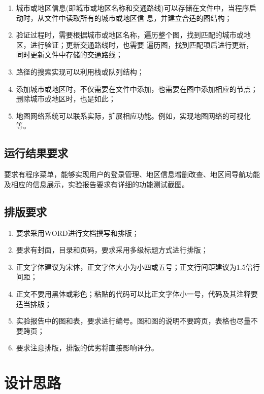 \documentclass[UTF8,12pt,a4paper]{ctexart}
\begin{document}
\begin{enumerate}[label=（\arabic*）, leftmargin=2em, itemsep=0.6em]
  \item 城市或地区信息(即城市或地区名称和交通路线)可以存储在文件中，当程序启动时，从文件中读取所有的城市或地区信       息，并建立合适的图结构；
  \item 验证过程时，需要根据城市或地区名称，遍历整个图，找到匹配的城市或地区，进行验证；更新交通路线时，也需要         遍历图，找到匹配项后进行更新，同时更新文件中存储的交通路线；
  \item 路径的搜索实现可以利用栈或队列结构；
  \item 添加城市或地区时，不仅需要在文件中添加，也需要在图中添加相应的节点；删除城市或地区时，也是如此；
  \item 地图网络系统可以联系实际，扩展相应功能。例如，实现地图网络的可视化等。
\end{enumerate}

\subsection{运行结果要求}

要求有程序菜单，能够实现用户的登录管理、地区信息增删改查、地区间导航功能及相应的信息展示，实验报告要求有详细的功能测试截图。

\subsection{排版要求}

\begin{enumerate}[label=（\arabic*）, leftmargin=2em, itemsep=0.6em]
  \item 要求采用WORD进行文档撰写和排版；
  \item 要求有封面，目录和页码，要求采用多级标题方式进行排版；
  \item 正文字体建议为宋体，正文字体大小为小四或五号；正文行间距建议为1.5倍行间距；
  \item 正文不要用黑体或彩色；粘贴的代码可以比正文字体小一号，代码及其注释要适当排版；
  \item 实验报告中的图和表，要求进行编号。图和图的说明不要跨页，表格也尽量不要跨页；
  \item 要求注意排版，排版的优劣将直接影响评分。
\end{enumerate}

\newpage
\section{设计思路}
\end{document}
